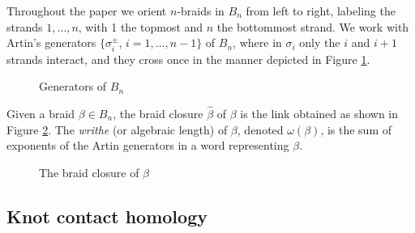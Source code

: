 \documentclass[11pt]{amsart}
\def\s{{\sigma}}
\theoremstyle{definition}
\begin{document}
  Throughout the paper we orient $n$-braids in $B_n$ from left to right, labeling the strands $1,\ldots, n$, with 1 the topmost and $n$ the bottommost strand. We work with Artin's generators $\{\sigma_i^{\pm}$, $i=1,\ldots,n-1\}$ of $B_n$, where in $\s_i$ only the $i$ and $i+1$ strands interact, and they cross once in the manner depicted in Figure \ref{fig:BraidGens}.
      \begin{figure}[ht]
        \caption{Generators of $B_n$}
        \label{fig:BraidGens}
      \end{figure}
    Given a braid $\beta\in B_n$, the braid closure $\hat{\beta}$ of $\beta$ is the link obtained as shown in Figure \ref{fig:BClosure}. The \emph{writhe} (or algebraic length) of $\beta$, denoted $\omega(\beta)$, is the sum of exponents of the Artin generators in a word representing $\beta$.

    \begin{figure}[ht]
      \caption{The braid closure of $\beta$}
      \label{fig:BClosure}
    \end{figure}

\subsection{Knot contact homology}
\label{SecBG_KCHdef}
\end{document}
